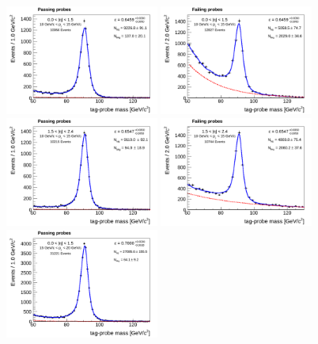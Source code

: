 \begin{figure}[!htbp]
\begin{center}
\includegraphics[width=0.45\textwidth]{figures/MuonSelectionEffMassFitPass_EtaPtBin0.pdf}
\includegraphics[width=0.45\textwidth]{figures/MuonSelectionEffMassFitFail_EtaPtBin0.pdf}
\includegraphics[width=0.45\textwidth]{figures/MuonSelectionEffMassFitPass_EtaPtBin1.pdf}
\includegraphics[width=0.45\textwidth]{figures/MuonSelectionEffMassFitFail_EtaPtBin1.pdf}
\includegraphics[width=0.45\textwidth]{figures/MuonSelectionEffMassFitPass_EtaPtBin2.pdf}

\end{center}
\end{figure}

